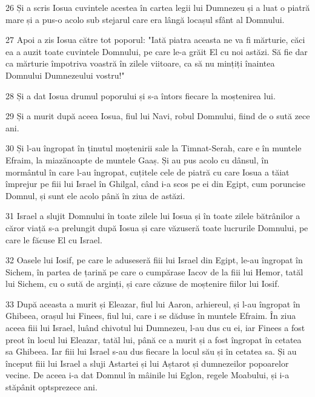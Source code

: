 \par 26 Și a scris Iosua cuvintele acestea în cartea legii lui Dumnezeu și a luat o piatră mare și a pus-o acolo sub stejarul care era lângă locașul sfânt al Domnului.
\par 27 Apoi a zis Iosua către tot poporul: "Iată piatra aceasta ne va fi mărturie, căci ea a auzit toate cuvintele Domnului, pe care le-a grăit El cu noi astăzi. Să fie dar ca mărturie împotriva voastră în zilele viitoare, ca să nu mințiți înaintea Domnului Dumnezeului vostru!"
\par 28 Și a dat Iosua drumul poporului și s-a întors fiecare la moștenirea lui.
\par 29 Și a murit după aceea Iosua, fiul lui Navi, robul Domnului, fiind de o sută zece ani.
\par 30 Și l-au îngropat în ținutul moștenirii sale la Timnat-Serah, care e în muntele Efraim, la miazănoapte de muntele Gaaș. Și au pus acolo cu dânsul, în mormântul în care l-au îngropat, cuțitele cele de piatră cu care Iosua a tăiat împrejur pe fiii lui Israel în Ghilgal, când i-a scos pe ei din Egipt, cum poruncise Domnul, și sunt ele acolo până în ziua de astăzi.
\par 31 Israel a slujit Domnului în toate zilele lui Iosua și în toate zilele bătrânilor a căror viață s-a prelungit după Iosua și care văzuseră toate lucrurile Domnului, pe care le făcuse El cu Israel.
\par 32 Oasele lui Iosif, pe care le aduseseră fiii lui Israel din Egipt, le-au îngropat în Sichem, în partea de țarină pe care o cumpărase Iacov de la fiii lui Hemor, tatăl lui Sichem, cu o sută de arginți, și care căzuse de moștenire fiilor lui Iosif.
\par 33 După aceasta a murit și Eleazar, fiul lui Aaron, arhiereul, și l-au îngropat în Ghibeea, orașul lui Finees, fiul lui, care i se dăduse în muntele Efraim. În ziua aceea fiii lui Israel, luând chivotul lui Dumnezeu, l-au dus cu ei, iar Finees a fost preot în locul lui Eleazar, tatăl lui, până ce a murit și a fost îngropat în cetatea sa Ghibeea. Iar fiii lui Israel s-au dus fiecare la locul său și în cetatea sa. Și au început fiii lui Israel a sluji Astartei și lui Aștarot și dumnezeilor popoarelor vecine. De aceea i-a dat Domnul în mâinile lui Eglon, regele Moabului, și i-a stăpânit optsprezece ani.


